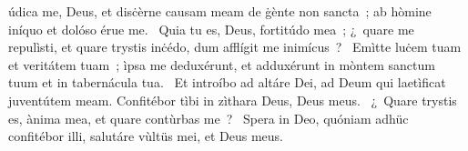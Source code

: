 \psalmChapterWithInscription{}
{ }
{%
údica me, Deus, et disċèrne causam meam de ġènte non sancta~; ab hòmine iníquo et dolóso érue me. 
~Quia tu es, Deus, fortitúdo mea~; ¿~quare me repulìsti, et quare trystis inċédo, dum afflígit me inimícus~? 
~Emìtte luċem tuam et veritátem tuam~; ìpsa me deduxérunt, et adduxérunt in mòntem sanctum tuum et in tabernácula tua. 
~Et introíbo ad altáre Dei, ad Deum qui laetìficat juventútem meam. Confitébor tìbi in zìthara Deus, Deus meus. 
~¿~Quare trystis es, ànima mea, et quare contùrbas me~?  
~Spera in Deo, quóniam adhüc confitébor illi, salutáre vùltüs mei, et Deus meus. 
}
